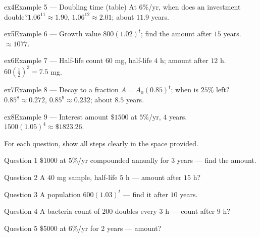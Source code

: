 \documentclass[11pt]{article}
\begin{document}
\begin{example}{ex4}{Example 5 --- Doubling time (table)}
At $6\%$/yr, when does an investment double?\soln $1.06^{11}\approx1.90$, $1.06^{12}\approx2.01$; about $11.9$ years.
\end{example}

\begin{example}{ex5}{Example 6 --- Growth value}
$800(1.02)^{t}$; find the amount after $15$ years.\soln $\approx1077$.
\end{example}

\begin{example}{ex6}{Example 7 --- Half-life count}
$60$ mg, half-life $4$ h; amount after $12$ h.\soln $60\left(\tfrac12\right)^{3}=7.5$ mg.
\end{example}

\begin{example}{ex7}{Example 8 --- Decay to a fraction}
$A=A_0(0.85)^{t}$; when is $25\%$ left?\soln $0.85^{8}\approx0.272$, $0.85^{9}\approx0.232$; about $8.5$ years.
\end{example}

\begin{example}{ex8}{Example 9 --- Interest amount}
$\$1500$ at $5\%$/yr, $4$ years.\soln $1500(1.05)^{4}\approx\$1823.26$.
\end{example}

\clearpage
{}
For each question, show all steps clearly in the space provided.

\begin{qbox}{Question 1}
$\$1000$ at $5\%$/yr compounded annually for $3$ years — find the amount.\workspace{2.4cm}
\end{qbox}

\begin{qbox}{Question 2}
A $40$ mg sample, half-life $5$ h — amount after $15$ h?\workspace{2.4cm}
\end{qbox}

\begin{qbox}{Question 3}
A population $600(1.03)^{t}$ — find it after $10$ years.\workspace{2.4cm}
\end{qbox}

\begin{qbox}{Question 4}
A bacteria count of $200$ doubles every $3$ h — count after $9$ h?\workspace{2.4cm}
\end{qbox}

\begin{qbox}{Question 5}
\$5000 at $6\%$/yr for $2$ years — amount?\workspace{2.4cm}
\end{qbox}
\end{document}
